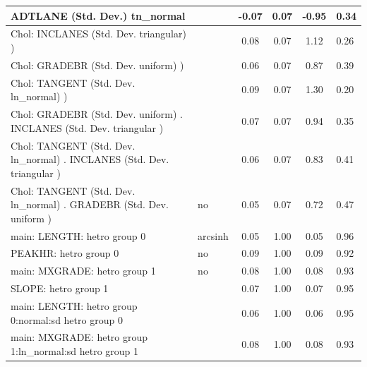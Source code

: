 \begin{table}
\begin{center}
\begin{tabular}{|l|l|c|c|c|l|}
			\hline
			ADTLANE (Std. Dev.) tn_normal &  & -0.07 & 0.07 & -0.95 & 0.34 \\
			\hline
			 Chol: INCLANES (Std. Dev. triangular) ) &  & 0.08 & 0.07 & 1.12 & 0.26 \\
			\hline
			 Chol: GRADEBR (Std. Dev. uniform) ) &  & 0.06 & 0.07 & 0.87 & 0.39 \\
			\hline
			 Chol: TANGENT (Std. Dev. ln_normal) ) &  & 0.09 & 0.07 & 1.30 & 0.20 \\
			\hline
			 Chol: GRADEBR (Std. Dev. uniform) . INCLANES (Std. Dev.   triangular ) &  & 0.07 & 0.07 & 0.94 & 0.35 \\
			\hline
			 Chol: TANGENT (Std. Dev. ln_normal) . INCLANES (Std. Dev.   triangular ) &  & 0.06 & 0.07 & 0.83 & 0.41 \\
			\hline
			 Chol: TANGENT (Std. Dev. ln_normal) . GRADEBR (Std. Dev.   uniform ) & no & 0.05 & 0.07 & 0.72 & 0.47 \\
			\hline
			main: LENGTH: hetro group 0 & arcsinh & 0.05 & 1.00 & 0.05 & 0.96 \\
			\hline
			PEAKHR: hetro group 0 & no & 0.09 & 1.00 & 0.09 & 0.92 \\
			\hline
			main: MXGRADE: hetro group 1 & no & 0.08 & 1.00 & 0.08 & 0.93 \\
			\hline
			SLOPE: hetro group 1 &  & 0.07 & 1.00 & 0.07 & 0.95 \\
			\hline
			main: LENGTH: hetro group 0:normal:sd  hetro group 0 &  & 0.06 & 1.00 & 0.06 & 0.95 \\
			\hline
			main: MXGRADE: hetro group 1:ln_normal:sd  hetro group 1 &  & 0.08 & 1.00 & 0.08 & 0.93 \\
			\hline
		\end{tabular}
	\end{center}
\end{table}